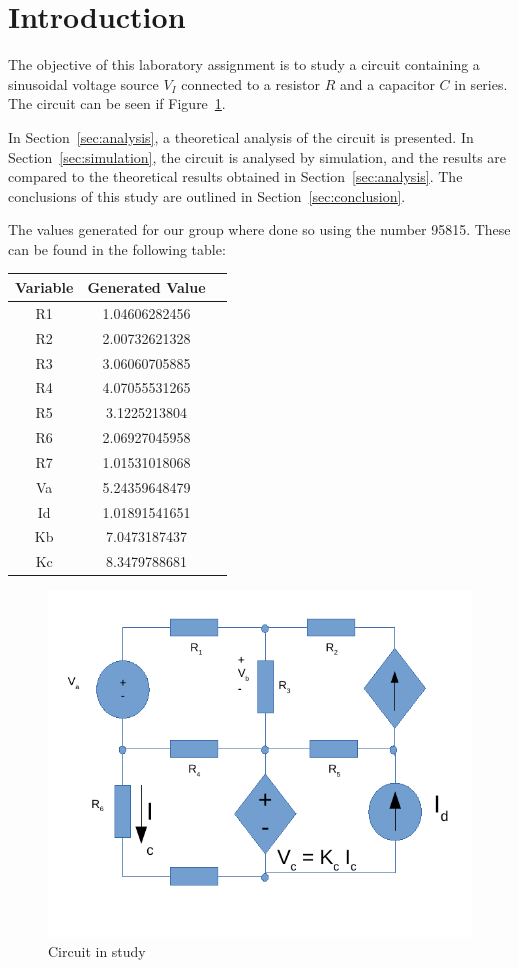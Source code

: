 \section{Introduction}
\label{sec:introduction}

The objective of this laboratory assignment is to study a circuit containing a
sinusoidal voltage source $V_I$ connected to a resistor $R$ and a capacitor $C$
in series. The circuit can be seen if Figure~\ref{fig:circuit_t1}.

In Section~\ref{sec:analysis}, a theoretical analysis of the circuit is
presented. In Section~\ref{sec:simulation}, the circuit is analysed by
simulation, and the results are compared to the theoretical results obtained in
Section~\ref{sec:analysis}. The conclusions of this study are outlined in
Section~\ref{sec:conclusion}.

The values generated for our group where done so using the number 95815. These can be found in the following table:

\begin{center}
\begin{tabular}{ |c|c|c| }
 \hline
 Variable & Generated Value \\ 
 \hline
 R1 & 1.04606282456 \\
 \hline
 R2 & 2.00732621328 \\
 \hline
 R3 & 3.06060705885\\
 \hline
 R4 & 4.07055531265 \\
 \hline
 R5 & 3.1225213804 \\
 \hline
 R6 & 2.06927045958 \\
 \hline
 R7 & 1.01531018068 \\
 \hline
 Va & 5.24359648479 \\
 \hline
 Id & 1.01891541651 \\
 \hline
 Kb & 7.0473187437 \\
 \hline
 Kc & 8.3479788681 \\
 \hline
\end{tabular}
\end{center}

\begin{figure}[h] \centering
\includegraphics[width=0.4\linewidth]{circuit_t1.pdf}
\caption{Circuit in study}
\label{fig:circuit_t1}
\end{figure}

